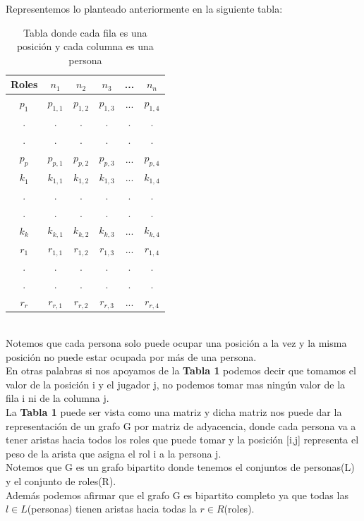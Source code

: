 \documentclass[sn-mathphys,Numbered]{sn-jnl}%
\theoremstyle{thmstyleone}%
\theoremstyle{thmstyletwo}%
\theoremstyle{thmstylethree}%
\begin{document}
Representemos lo planteado anteriormente en la siguiente tabla:
\begin{table}[t]
\begin{center}
\begin{tabular}{| c | c | c | c | c | c | }
\hline
Roles & $n_1$  & $n_2$ & $n_3$ & ... & $n_n$ \\ \hline
$p_1$ &  $p_{1,1}$ &  $p_{1,2}$ &  $p_{1,3}$ &... &  $p_{1,4}$ \\ \hline
. & . & . & .& .& . \\ \hline
. & . & . & .& .& .\\ \hline
$p_p$ &  $p_{p,1}$ &  $p_{p,2}$ &  $p_{p,3}$ &... &  $p_{p,4}$\\ \hline
$k_1$ &  $k_{1,1}$ &  $k_{1,2}$ &  $k_{1,3}$ &... &  $k_{1,4}$\\ \hline
. & . & . & .& . & .\\ \hline
. & . & . & .& .& .\\ \hline
$k_k$ &  $k_{k,1}$ &  $k_{k,2}$ &  $k_{k,3}$ &... &  $k_{k,4}$\\ \hline
$r_1$ &  $r_{1,1}$ &  $r_{1,2}$ &  $r_{1,3}$ & ... &  $r_{1,4}$\\ \hline
. & . & . & .& .& .\\ \hline
. & . & . & .& .& .\\ \hline
$r_r$ &  $r_{r,1}$ &  $r_{r,2}$ &  $r_{r,3}$ &... &  $r_{r,4}$\\ \hline
\end{tabular}
\caption{Tabla donde cada fila es una posición y cada columna es una persona }
\label{tab:coches}
\end{center}
\end{table}\\
Notemos que cada persona solo puede ocupar una posición a la vez y la misma posición no puede estar ocupada por m\'as de una persona.\\
En otras palabras si nos apoyamos de la \textbf{Tabla 1} podemos decir que tomamos el valor de la posición  i y el  jugador  j, no podemos tomar mas ningún valor de la fila i ni de la columna j.\\
La \textbf{Tabla 1} puede ser vista como una matriz y dicha matriz nos puede dar la representación de un grafo G por matriz de adyacencia, donde cada persona va a tener aristas hacia todos los roles que puede tomar y la posición [i,j] representa el peso de la arista que asigna el rol i a la persona j.\\
Notemos que G es un grafo bipartito donde tenemos el conjuntos de personas(L) y el conjunto de roles(R).\\
Adem\'as podemos afirmar que el grafo G es bipartito completo ya que todas las $l \in L$(personas) tienen aristas hacia todas la $r \in R$(roles).\\
\end{document}
